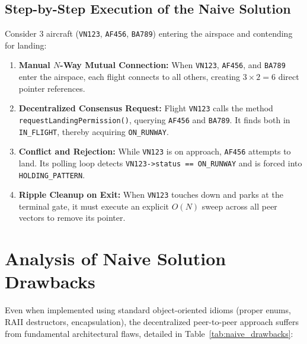 \documentclass[12pt,a4paper]{article}
\begin{document}
\subsection{Step-by-Step Execution of the Naive Solution}
Consider 3 aircraft (\texttt{VN123}, \texttt{AF456}, \texttt{BA789}) entering the airspace and contending for landing:
\begin{enumerate}
    \item \textbf{Manual $N$-Way Mutual Connection:} When \texttt{VN123}, \texttt{AF456}, and \texttt{BA789} enter the airspace, each flight connects to all others, creating $3 \times 2 = 6$ direct pointer references.
    \item \textbf{Decentralized Consensus Request:} Flight \texttt{VN123} calls the method \texttt{requestLandingPermission()}, querying \texttt{AF456} and \texttt{BA789}. It finds both in \texttt{IN\_FLIGHT}, thereby acquiring \texttt{ON\_RUNWAY}.
    \item \textbf{Conflict and Rejection:} While \texttt{VN123} is on approach, \texttt{AF456} attempts to land. Its polling loop detects \texttt{VN123->status == ON\_RUNWAY} and is forced into \texttt{HOLDING\_PATTERN}.
    \item \textbf{Ripple Cleanup on Exit:} When \texttt{VN123} touches down and parks at the terminal gate, it must execute an explicit $O(N)$ sweep across all peer vectors to remove its pointer.
\end{enumerate}

\newpage
\section{Analysis of Naive Solution Drawbacks}

Even when implemented using standard object-oriented idioms (proper enums, RAII destructors, encapsulation), the decentralized peer-to-peer approach suffers from fundamental architectural flaws, detailed in Table~\ref{tab:naive_drawbacks}:
\end{document}
